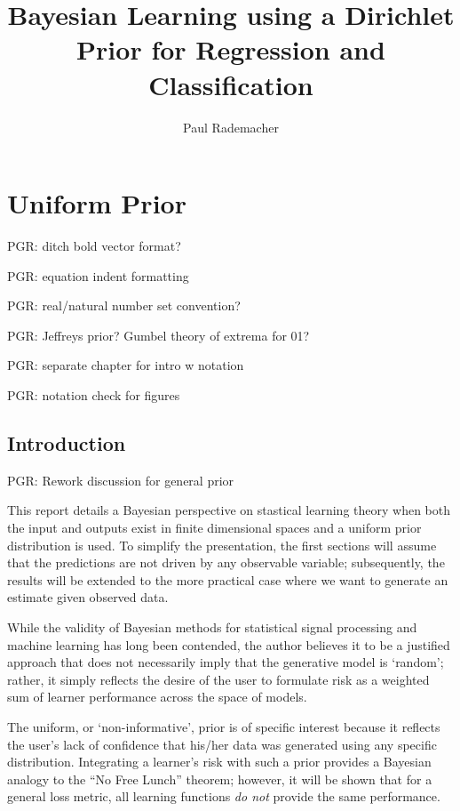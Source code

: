 \documentclass[12pt]{report}
\title{Bayesian Learning using a Dirichlet Prior for Regression and Classification}
\author{Paul Rademacher}
\begin{document}
\maketitle
\tableofcontents

\chapter{Uniform Prior}

PGR: ditch bold vector format?

PGR: equation indent formatting

PGR: real/natural number set convention?

PGR: Jeffreys prior? Gumbel theory of extrema for 01?

PGR: separate chapter for intro w notation

PGR: notation check for figures


\section{Introduction}

PGR: Rework discussion for general prior



This report details a Bayesian perspective on stastical learning theory when both the input and outputs exist in finite dimensional spaces and a uniform prior distribution is used. To simplify the presentation, the first sections will assume that the predictions are not driven by any observable variable; subsequently, the results will be extended to the more practical case where we want to generate an estimate given observed data.

While the validity of Bayesian methods for statistical signal processing and machine learning has long been contended, the author believes it to be a justified approach that does not necessarily imply that the generative model is `random'; rather, it simply reflects the desire of the user to formulate risk as a weighted sum of learner performance across the space of models. 

The uniform, or `non-informative', prior is of specific interest because it reflects the user's lack of confidence that his/her data was generated using any specific distribution. Integrating a learner's risk with such a prior provides a Bayesian analogy to the ``No Free Lunch'' theorem; however, it will be shown that for a general loss metric, all learning functions \emph{do not} provide the same performance.
\end{document}
